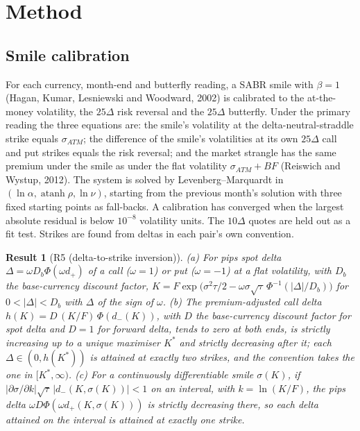 \documentclass[11pt]{article}
\theoremstyle{result}
\newtheorem*{result}{Result}
\newcommand{\D}{\Delta}
\begin{document}
\section{Method}\label{sec:method}

\subsection{Smile calibration}

For each currency, month-end and butterfly reading, a SABR smile with $\beta=1$ (Hagan, Kumar, Lesniewski and Woodward, 2002) is calibrated to the at-the-money volatility, the $25\D$ risk reversal and the $25\D$ butterfly. Under the primary reading the three equations are: the smile's volatility at the delta-neutral-straddle strike equals $\sigma_{ATM}$; the difference of the smile's volatilities at its own $25\D$ call and put strikes equals the risk reversal; and the market strangle has the same premium under the smile as under the flat volatility $\sigma_{ATM}+BF$ (Reiswich and Wystup, 2012). The system is solved by Levenberg--Marquardt in $(\ln\alpha,\operatorname{atanh}\rho,\ln\nu)$, starting from the previous month's solution with three fixed starting points as fall-backs. A calibration has converged when the largest absolute residual is below $10^{-8}$ volatility units. The $10\D$ quotes are held out as a fit test. Strikes are found from deltas in each pair's own convention.

\begin{result}[R5 (delta-to-strike inversion)]
(a) For pips spot delta $\D=\omega D_b\Phi(\omega d_+)$ of a call ($\omega=1$) or put ($\omega=-1$) at a flat volatility, with $D_b$ the base-currency discount factor, $K=F\exp\bigl(\sigma^2\tau/2-\omega\sigma\sqrt\tau\,\Phi^{-1}(|\D|/D_b)\bigr)$ for $0<|\D|<D_b$ with $\D$ of the sign of $\omega$. (b) The premium-adjusted call delta $h(K)=D\,(K/F)\,\Phi(d_-(K))$, with $D$ the base-currency discount factor for spot delta and $D=1$ for forward delta, tends to zero at both ends, is strictly increasing up to a unique maximiser $K^*$ and strictly decreasing after it; each $\D\in(0,h(K^*))$ is attained at exactly two strikes, and the convention takes the one in $[K^*,\infty)$. (c) For a continuously differentiable smile $\sigma(K)$, if $|\partial\sigma/\partial k|\sqrt\tau\,|d_-(K,\sigma(K))|<1$ on an interval, with $k=\ln(K/F)$, the pips delta $\omega D\Phi(\omega d_+(K,\sigma(K)))$ is strictly decreasing there, so each delta attained on the interval is attained at exactly one strike.
\end{result}
\end{document}
